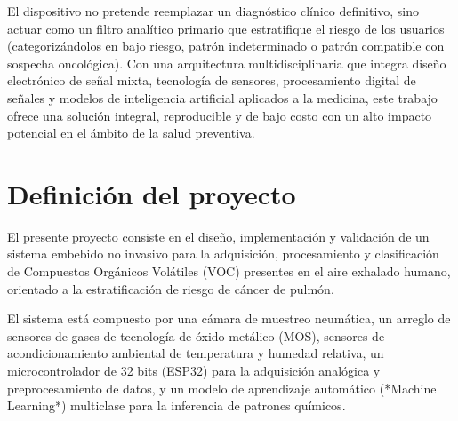 \documentclass[12pt]{article}
\begin{document}
El dispositivo no pretende reemplazar un diagnóstico clínico definitivo, sino actuar como un filtro analítico primario que estratifique el riesgo de los usuarios (categorizándolos en bajo riesgo, patrón indeterminado o patrón compatible con sospecha oncológica). Con una arquitectura multidisciplinaria que integra diseño electrónico de señal mixta, tecnología de sensores, procesamiento digital de señales y modelos de inteligencia artificial aplicados a la medicina, este trabajo ofrece una solución integral, reproducible y de bajo costo con un alto impacto potencial en el ámbito de la salud preventiva.

\section{Definición del proyecto}

El presente proyecto consiste en el diseño, implementación y validación de un sistema embebido no invasivo para la adquisición, procesamiento y clasificación de Compuestos Orgánicos Volátiles (VOC) presentes en el aire exhalado humano, orientado a la estratificación de riesgo de cáncer de pulmón. 

El sistema está compuesto por una cámara de muestreo neumática, un arreglo de sensores de gases de tecnología de óxido metálico (MOS), sensores de acondicionamiento ambiental de temperatura y humedad relativa, un microcontrolador de 32 bits (ESP32) para la adquisición analógica y preprocesamiento de datos, y un modelo de aprendizaje automático (*Machine Learning*) multiclase para la inferencia de patrones químicos.
\end{document}
